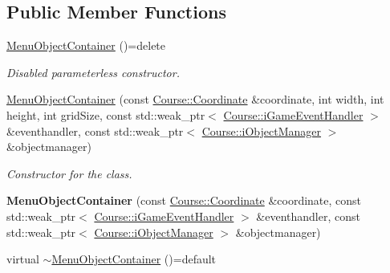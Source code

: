 \subsection*{Public Member Functions}
\begin{DoxyCompactItemize}
\item 
\hypertarget{class_student_1_1_menu_object_container_ab8bbe6686158f4f2d1cedae2ee0c6b89}{\hyperlink{class_student_1_1_menu_object_container_ab8bbe6686158f4f2d1cedae2ee0c6b89}{Menu\-Object\-Container} ()=delete}\label{class_student_1_1_menu_object_container_ab8bbe6686158f4f2d1cedae2ee0c6b89}

\begin{DoxyCompactList}\small\item\em Disabled parameterless constructor. \end{DoxyCompactList}\item 
\hypertarget{class_student_1_1_menu_object_container_a37e14a6145169dc257f8098c38bde0d8}{\hyperlink{class_student_1_1_menu_object_container_a37e14a6145169dc257f8098c38bde0d8}{Menu\-Object\-Container} (const \hyperlink{class_course_1_1_coordinate}{Course\-::\-Coordinate} \&coordinate, int width, int height, int grid\-Size, const std\-::weak\-\_\-ptr$<$ \hyperlink{class_course_1_1i_game_event_handler}{Course\-::i\-Game\-Event\-Handler} $>$ \&eventhandler, const std\-::weak\-\_\-ptr$<$ \hyperlink{class_course_1_1i_object_manager}{Course\-::i\-Object\-Manager} $>$ \&objectmanager)}\label{class_student_1_1_menu_object_container_a37e14a6145169dc257f8098c38bde0d8}

\begin{DoxyCompactList}\small\item\em Constructor for the class. \end{DoxyCompactList}\item 
\hypertarget{class_student_1_1_menu_object_container_a81e1e14f0220c089cdc4397260579367}{{\bfseries Menu\-Object\-Container} (const \hyperlink{class_course_1_1_coordinate}{Course\-::\-Coordinate} \&coordinate, const std\-::weak\-\_\-ptr$<$ \hyperlink{class_course_1_1i_game_event_handler}{Course\-::i\-Game\-Event\-Handler} $>$ \&eventhandler, const std\-::weak\-\_\-ptr$<$ \hyperlink{class_course_1_1i_object_manager}{Course\-::i\-Object\-Manager} $>$ \&objectmanager)}\label{class_student_1_1_menu_object_container_a81e1e14f0220c089cdc4397260579367}

\item 
\hypertarget{class_student_1_1_menu_object_container_a796ce03c62dd79c1e6424cbf335a44c0}{virtual \hyperlink{class_student_1_1_menu_object_container_a796ce03c62dd79c1e6424cbf335a44c0}{$\sim$\-Menu\-Object\-Container} ()=default}\label{class_student_1_1_menu_object_container_a796ce03c62dd79c1e6424cbf335a44c0}


\end{DoxyCompactItemize}
